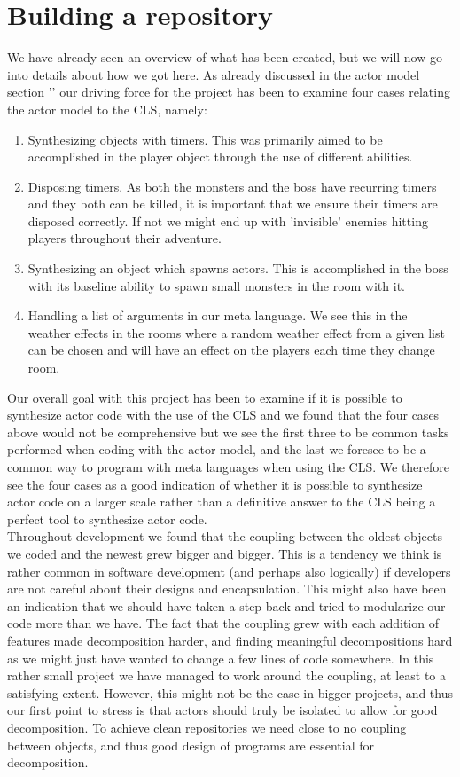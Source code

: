 \section{Building a repository} \label{BuildRep}
We have already seen an overview of what has been created, but we will now go into details about how we got here. As already discussed in the actor model section '' our driving force for the project has been to examine four cases relating the actor model to the CLS, namely:
\begin{enumerate}
	\item Synthesizing objects with timers. This was primarily aimed to be accomplished in the player object through the use of different abilities.
	\item Disposing timers. As both the monsters and the boss have recurring timers and they both can be killed, it is important that we ensure their timers are disposed correctly. If not we might end up with 'invisible' enemies hitting players throughout their adventure.
	\item Synthesizing an object which spawns actors. This is accomplished in the boss with its baseline ability to spawn small monsters in the room with it.
	\item Handling a list of arguments in our meta language. We see this in the weather effects in the rooms where a random weather effect from a given list can be chosen and will have an effect on the players each time they change room.
\end{enumerate}
Our overall goal with this project has been to examine if it is possible to synthesize actor code with the use of the CLS and we found that the four cases above would not be comprehensive but we see the first three to be common tasks performed when coding with the actor model, and the last we foresee to be a common way to program with meta languages when using the CLS. We therefore see the four cases as a good indication of whether it is possible to synthesize actor code on a larger scale rather than a definitive answer to the CLS being a perfect tool to synthesize actor code.\\

Throughout development we found that the coupling between the oldest objects we coded and the newest grew bigger and bigger. This is a tendency we think is rather common in software development (and perhaps also logically) if developers are not careful about their designs and encapsulation. This might also have been an indication that we should have taken a step back and tried to modularize our code more than we have. The fact that the coupling grew with each addition of features made decomposition harder, and finding meaningful decompositions hard as we might just have wanted to change a few lines of code somewhere. In this rather small project we have managed to work around the coupling, at least to a satisfying extent. However, this might not be the case in bigger projects, and thus our first point to stress is that actors should truly be isolated to allow for good decomposition. To achieve clean repositories we need close to no coupling between objects, and thus good design of programs are essential for decomposition.

